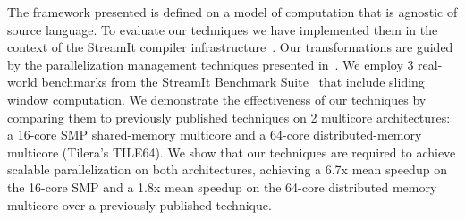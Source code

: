 The framework presented is defined on a model of computation that is
agnostic of source language.  To evaluate our techniques we have
implemented them in the context of the StreamIt compiler
infrastructure~\cite{gordon-asplos06}.  Our transformations are guided
by the parallelization management techniques presented
in~\cite{gordon-asplos06}.  We employ 3 real-world benchmarks from the
StreamIt Benchmark Suite~\cite{streamit-suite} that include sliding
window computation.  We demonstrate the effectiveness of our
techniques by comparing them to previously published techniques on 2
multicore architectures: a 16-core SMP shared-memory multicore and a
64-core distributed-memory multicore (Tilera's TILE64).  We show that
our techniques are required to achieve scalable parallelization on
both architectures, achieving a 6.7x mean speedup on the 16-core SMP
and a 1.8x mean speedup on the 64-core distributed memory multicore
over a previously published technique.

